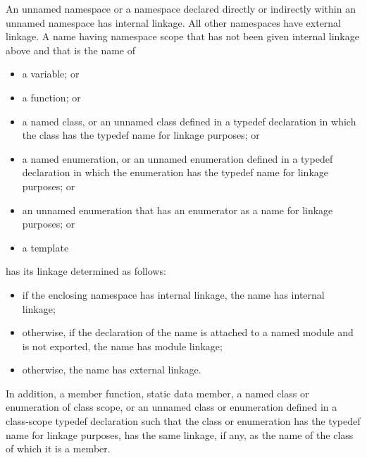 \pnum
An unnamed namespace or a namespace declared directly or indirectly within an
unnamed namespace has internal linkage. All other namespaces have external linkage.
A name having namespace scope
that has not been given internal linkage above
and that is the name of
\begin{itemize}
\item a variable; or
\item a function; or
\item
{}%
a named class, or an unnamed class defined in a
typedef declaration in which the class has the typedef name for linkage
purposes; or
\item
{}%
a named enumeration, or an unnamed enumeration defined
in a typedef declaration in which the enumeration has the typedef name
for linkage purposes; or
\item an unnamed enumeration
that has an enumerator as a name for linkage purposes; or
\item a template
\end{itemize}
has its linkage determined as follows:
\begin{itemize}
\item
if the enclosing namespace has internal linkage,
the name has internal linkage;
\item
otherwise,
if the declaration of the name is
attached to a named module
and is not exported,
the name has module linkage;
\item
otherwise,
the name has external linkage.
\end{itemize}

\pnum
In addition, a member function, static data member, a named class or
enumeration of class scope, or an unnamed class or enumeration defined
in a class-scope typedef declaration such that the class or enumeration
has the typedef name for linkage purposes, has
the same linkage, if any, as the name of the class of which it is a
member.

